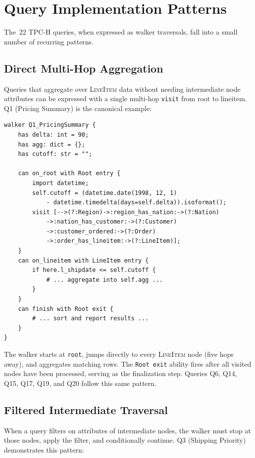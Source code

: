 \documentclass[11pt]{article}
\begin{document}
\section{Query Implementation Patterns}

The~22 TPC-H queries, when expressed as walker traversals, fall into a small
number of recurring patterns.

\subsection{Direct Multi-Hop Aggregation}

Queries that aggregate over \textsc{LineItem} data without needing
intermediate node attributes can be expressed with a single multi-hop
\lstinline|visit| from root to lineitem.
Q1 (Pricing Summary) is the canonical example:

\begin{lstlisting}
walker Q1_PricingSummary {
    has delta: int = 90;
    has agg: dict = {};
    has cutoff: str = "";

    can on_root with Root entry {
        import datetime;
        self.cutoff = (datetime.date(1998, 12, 1)
            - datetime.timedelta(days=self.delta)).isoformat();
        visit [-->(?:Region)->:region_has_nation:->(?:Nation)
            ->:nation_has_customer:->(?:Customer)
            ->:customer_ordered:->(?:Order)
            ->:order_has_lineitem:->(?:LineItem)];
    }
    can on_lineitem with LineItem entry {
        if here.l_shipdate <= self.cutoff {
            # ... aggregate into self.agg ...
        }
    }
    can finish with Root exit {
        # ... sort and report results ...
    }
}
\end{lstlisting}

The walker starts at \texttt{root}, jumps directly to every
\textsc{LineItem} node (five hops away), and aggregates matching rows.
The \lstinline|Root exit| ability fires after all visited nodes have been
processed, serving as the finalization step.
Queries Q6, Q14, Q15, Q17, Q19, and Q20 follow this same pattern.

\subsection{Filtered Intermediate Traversal}

When a query filters on attributes of intermediate nodes, the walker must
stop at those nodes, apply the filter, and conditionally continue.
Q3 (Shipping Priority) demonstrates this pattern:
\end{document}
